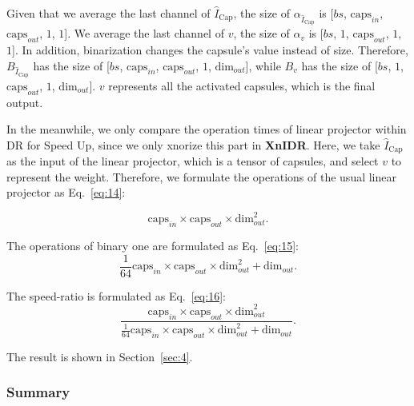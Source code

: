 \documentclass[sn-mathphys,iicol,Numbered]{sn-jnl}
\begin{document}
Given that we average the last channel of $\hat{I}_{\text{Cap}}$, the size of $\alpha_{\hat{I}_{\text{Cap}}}$ is [$bs$, $\text{caps}_{in}$, $\text{caps}_{out}$, $1$, $1$]. We average the last channel of $v$, the size of $\alpha_{v}$ is [$bs$, $1$, $\text{caps}_{out}$, $1$, $1$]. In addition, binarization changes the capsule's value instead of size. Therefore, $B_{\hat{I}_{\text{Cap}}}$ has the size of [$bs$, $\text{caps}_{in}$, $\text{caps}_{out}$, $1$, $\text{dim}_{out}$], while $B_{v}$ has the size of [$bs$, $1$, $\text{caps}_{out}$, $1$, $\text{dim}_{out}$]. $v$ represents all the activated capsules, which is the final output.

In the meanwhile, we only compare the operation times of linear projector within DR for Speed Up, since we only xnorize this part in \textbf{XnIDR}. Here, we take $\hat{I}_{\text{Cap}}$ as the input of the linear projector, which is a tensor of capsules, and select $v$ to represent the weight. Therefore, we formulate the operations of the usual linear projector as Eq.~\ref{eq:14}:

\vspace{-0.2cm}
\begin{equation} \label{eq:14}
\text{caps}_{in}\times \text{caps}_{out}\times \text{dim}_{out}^{2}.
\end{equation}

The operations of binary one are formulated as Eq.~\ref{eq:15}:
\begin{equation} \label{eq:15}
\frac{1}{64} \text{caps}_{in} \times \text{caps}_{out} 
\times \text{dim}_{out}^{2} + \text{dim}_{out}.
\end{equation}
\vspace{-0.3cm}

The speed-ratio is formulated as Eq.~\ref{eq:16}:
\begin{equation} \label{eq:16}
    \frac{\text{caps}_{in}\times \text{caps}_{out}\times \text{dim}_{out}^{2}}{\frac{1}{64}\text{caps}_{in}\times \text{caps}_{out}\times \text{dim}_{out}^{2} + \text{dim}_{out}}.
\end{equation}
\vspace{-0.4cm}

The result is shown in Section~\ref{sec:4}.

\subsubsection{Summary} \label{sec:3.3.3}
\end{document}
